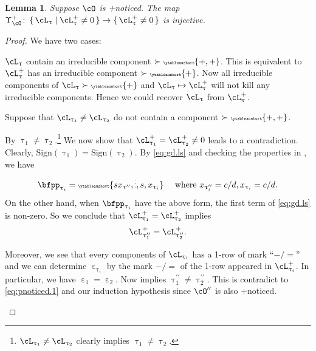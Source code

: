 \documentclass[12pt,a4paper]{amsart}
\numberwithin{equation}{section}
\newtheorem{lem}[thm]{Lemma}
\theoremstyle{remark}
\def\ssign{\mathrm{Sign}}
\let\ytb=\ytableaushort
\newcommand{\tytb}[1]{{\tiny\ytb{#1}}}
\def\cOpp{\cO^{\prime\prime}}
\def\pUpsilon{\Upsilon^+}
\def\pcL{\cL^+}
\def\uptaupp{\uptau^{\prime\prime}}
\begin{document}
\begin{lem}\label{c:gd.pnoticed}\label{c:gd.pnoticed.p}
    Suppose $\cO$ is +noticed.
    The map
    $\pUpsilon_{\cO} \colon \set{\cL_{\uptau}|\pcL_{\uptau}\neq 0}\rightarrow \set{\pcL_{\uptau}\neq 0}$
    is injective.
\end{lem}
\begin{proof}
    We have two cases:
    \begin{enumPF}
      \item $\cL_{\uptau}$ contain an irreducible component $\succ \tytb{+,+}$.
      This is equivalent to $\pcL_{\uptau}$ has an irreducible component
      $\succ\tytb{+}$. Now all irreducible components of
      $\cL_{\uptau} \succ \tytb{+}$ and $\cL_{\uptau}\mapsto \pcL_{\uptau}$ will
      not kill any irreducible components. Hence we could recover $\cL_{\uptau}$
      from $\pcL_{\uptau}$.%
      \item Suppose that $\cL_{\uptau_{1}}\neq \cL_{\uptau_{2}}$ do not contain
      a component $\succ \tytb{+,+}$.

      By 
      $\uptau_{1}\neq \uptau_{2}$.\footnote{$\cL_{\uptau_{1}}\neq \cL_{\uptau_{2}}$
        clearly implies $\uptau_{1}\neq \uptau_{2}$.} We now show that
      $\pcL_{\uptau_{1}}=\pcL_{\uptau_{2}}\neq 0$ leads to a contradiction.
      Clearly, $\ssign(\uptau_{1})=\ssign(\uptau_{2})$.
      By \eqref{eq:gd.ls} and checking the properties in , we have
      \[
        \bfpp_{\uptau_{i}} = \tytb{s{x_{\uptaupp}},\vdots,s,{x_{\uptau_{i}}}} \quad \text{
          where }x_{\uptaupp_{i}}=c/d, x_{\uptau_{i}}=c/d.
      \]
      On the other hand, when $\bfpp_{\uptau_{i}}$ have the above form, the
      first term of \eqref{eq:gd.ls} is non-zero. So we conclude that
      $\pcL_{\uptau_{1}}=\pcL_{\uptau_{2}}$ implies
      \begin{equation}\label{eq:pnoticed.1}
        \pcL_{\uptaupp_{1}}=\pcL_{\uptaupp_{2}}.
      \end{equation}

      Moreover, we see that every components of $\cL_{\uptau_{i}}$ has a 1-row
      of mark ``$-/=$'' and we can determine $\upepsilon_{\uptau_{i}}$ by the
      mark $-/=$ of the 1-row appeared in $\pcL_{\uptau_{i}}$. In particular, we
      have $\upepsilon_{1}=\upepsilon_{2}$. Now  implies
      $\uptaupp_{1}\neq \uptaupp_{2}$. This is contradict to
      \eqref{eq:pnoticed.1} and our induction hypothesis since $\cOpp$ is also
      +noticed.


\end{enumPF}
\end{proof}
\end{document}
